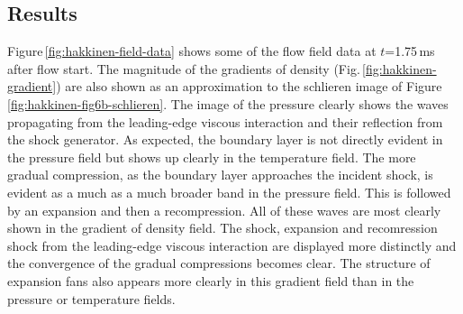 \subsection{Results}
%
Figure\,\ref{fig:hakkinen-field-data} shows some of the flow field data at $t$=1.75\,ms after flow start.
The magnitude of the gradients of density (Fig.\,\ref{fig:hakkinen-gradient}) are also shown 
as an approximation to the schlieren image of Figure\,\ref{fig:hakkinen-fig6b-schlieren}.
The image of the pressure clearly shows the waves propagating from the leading-edge viscous interaction
and their reflection from the shock generator.
As expected, the boundary layer is not directly evident in the pressure field but shows up
clearly in the temperature field.
The more gradual compression, as the boundary layer approaches the incident shock, is evident
as a much as a much broader band in the pressure field.
This is followed by an expansion and then a recompression.
All of these waves are most clearly shown in the gradient of density field.
The shock, expansion and recomression shock from the leading-edge viscous interaction 
are displayed more distinctly and the convergence of the gradual compressions becomes clear.
The structure of expansion fans also appears more clearly in this gradient field
than in the pressure or temperature fields.

